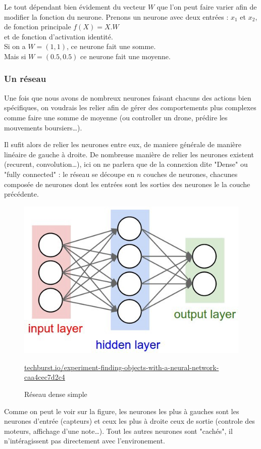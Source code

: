 Le tout dépendant bien évidement du vecteur $W$ que l'on peut faire varier afin de modifier la fonction du neurone.
\exemle
{
Prenons un neurone avec deux entrées : $x_1$ et $x_2$, \\
de fonction principale $f(X) = X.W$ \\
et de fonction d'activation identité. \\
Si on a $W = (1, 1)$, ce neurone fait une somme.\\
Mais si $W = (0.5, 0.5)$ ce neurone fait une moyenne.
}


\subsubsection{Un réseau}
Une fois que nous avons de nombreux neurones faisant chacuns des actions bien spécifiques,
on voudrais les relier afin de gérer des comportements plus complexes
comme faire une somme de moyenne (ou controller un drone, prédire les mouvements boursiers\ldots).

Il sufit alors de relier les neurones entre eux, de maniere générale de manière linéaire de gauche à droite.
De nombreuse manière de relier les neurones existent (recurent, convolution\ldots),
ici on ne parlera que de la connexion dite "Dense" ou "fully connected" :
le réseau se découpe en $n$ couches de neurones,
chacunes composée de neurones dont les entrées sont les sorties des neurones le la couche précédente.
\begin{figure}[H]
    \center
    \includegraphics[height=\petit]{pict/net1.jpeg}
	\caption{Réseau dense simple}
    {\tiny \url{techburst.io/experiment-finding-objects-with-a-neural-network-caa4cec7d2c4}}
	\label{fig:simple-dense}
\end{figure}
Comme on peut le voir sur la figure,
les neurones les plus à gauches sont les neurones d'entrée (capteurs)
et ceux les plus à droite ceux de sortie (controle des moteurs, affichage d'une note\ldots).
Tout les autres neurones sont "cachés", il n'intéragissent pas directement avec l'environement.


